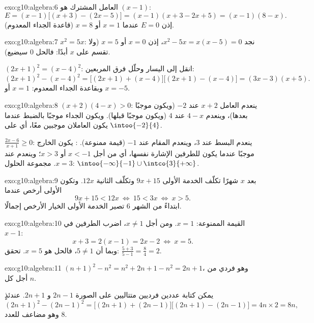 \begin{solution}{exo:g10:algebra:6}
العامل المشترك هو $(x-1)$:
\[
E = (x-1)\bigl[(x+3) - (2x - 5)\bigr] = (x-1)(x + 3 - 2x + 5)
= (x-1)(8 - x).
\]
إذن $E = 0$ عندما $x = 1$ أو $x = 8$ (قاعدة الجداء المعدوم).
\end{solution}

\begin{solution}{exo:g10:algebra:7}
$x^2 = 5x$: نجد $x^2 - 5x = x(x - 5) = 0$، إذن $x = 0$ أو $x = 5$ (ولا
تقسم على $x$ أبدًا: فالحل $0$ سيضيع).

$(2x+1)^2 = (x-4)^2$: انقل إلى اليسار وحلّل فرق
المربعين:
\[
(2x+1)^2 - (x-4)^2
= \bigl[(2x+1) + (x-4)\bigr]\bigl[(2x+1) - (x-4)\bigr]
= (3x - 3)(x + 5).
\]
وبقاعدة الجداء المعدوم: $x = 1$ أو $x = -5$.
\end{solution}

\begin{solution}{exo:g10:algebra:8}
$(x+2)(4-x) > 0$: ينعدم العامل $x + 2$ عند $-2$ (ويكون موجبًا بعدها)،
وينعدم $4 - x$ عند $4$ (ويكون موجبًا قبلها). ويكون الجداء موجبًا
بالضبط عندما يكون العاملان موجبين معًا، أي على $\intoo{-2}{4}$.

$\frac{2x-6}{x+1} \geq 0$: ينعدم البسط عند $3$، وينعدم المقام عند
$-1$ (قيمة ممنوعة). : يكون الخارج موجبًا عندما يكون
للطرفين الإشارة نفسها، أي من أجل $x < -1$ أو $x > 3$؛ وينعدم عند $x = 3$.
مجموعة الحلول: $\intoo{-\infty}{-1} \cup \intco{3}{+\infty}$.
\end{solution}

\begin{solution}{exo:g10:algebra:9}
بعد $x$ شهرًا تكلّف الخدمة الأولى $9x + 15$ وتكلّف الثانية $12x$.
وتكون الأولى أرخص عندما
\[
9x + 15 < 12x
\ \Longleftrightarrow\
15 < 3x
\ \Longleftrightarrow\
x > 5 .
\]
ابتداءً من الشهر $6$ تصير الخدمة الأولى الخيار الأرخص إجمالًا.
\end{solution}

\begin{solution}{exo:g10:algebra:10}
القيمة الممنوعة: $x = 1$. ومن أجل $x \neq 1$، اضرب الطرفين في $x - 1$:
\[
x + 3 = 2(x - 1) = 2x - 2
\ \Longleftrightarrow\
x = 5 .
\]
وبما أن $5 \neq 1$، فالحل هو $x = 5$. تحقق:
$\frac{5+3}{5-1} = \frac84 = 2$.
\end{solution}

\begin{solution}{exo:g10:algebra:11}
$(n+1)^2 - n^2 = n^2 + 2n + 1 - n^2 = 2n + 1$، وهو فردي من أجل كل
 $n$.

يمكن كتابة عددين فرديين متتاليين على الصورة $2n - 1$ و $2n + 1$. عندئذٍ
\[
(2n+1)^2 - (2n-1)^2
= \bigl[(2n+1)+(2n-1)\bigr]\bigl[(2n+1)-(2n-1)\bigr]
= 4n \times 2 = 8n,
\]
وهو مضاعف للعدد $8$.
\end{solution}

